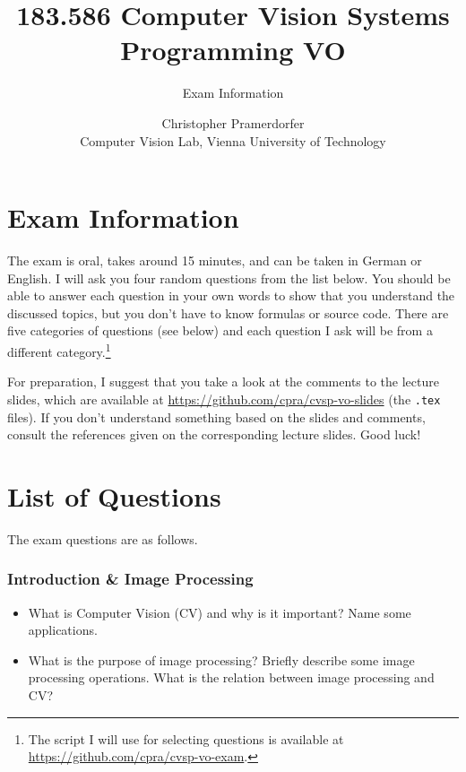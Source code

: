 \documentclass[paper=A4,11pt]{scrartcl}
\begin{document}
\title{\Large 183.586 Computer Vision Systems Programming VO}
\subtitle{Exam Information}
\author{Christopher Pramerdorfer\\\small Computer Vision Lab, Vienna University of Technology}
\maketitle

\section{Exam Information} %
\label{sec:exam_information}

The exam is oral, takes around 15 minutes, and can be taken in German or English. I will ask you four random questions from the list below. You should be able to answer each question in your own words to show that you understand the discussed topics, but you don't have to know formulas or source code. There are five categories of questions (see below) and each question I ask will be from a different category.\footnote{The script I will use for selecting questions is available at \url{https://github.com/cpra/cvsp-vo-exam}.}

For preparation, I suggest that you take a look at the comments to the lecture slides, which are available at \url{https://github.com/cpra/cvsp-vo-slides} (the \texttt{.tex} files). If you don't understand something based on the slides and comments, consult the references given on the corresponding lecture slides. Good luck!

\pagebreak

\section{List of Questions} %
\label{sec:list_of_questions}

The exam questions are as follows.

\subsubsection*{Introduction \& Image Processing} %
\label{ssub:introduction_image_processing}

\begin{itemize}
    \item What is Computer Vision (CV) and why is it important? Name some applications.
    \item What is the purpose of image processing? Briefly describe some image processing operations. What is the relation between image processing and CV?
\end{itemize}
\end{document}
